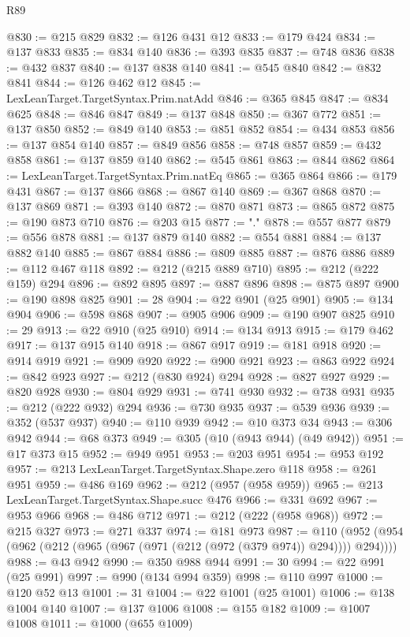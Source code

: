 \begin{lexlean}{R89}
\begin{coremodule}
@830 := @215 @829
@832 := @126 @431 @12
@833 := @179 @424
@834 := @137 @833
@835 := @834 @140
@836 := @393 @835
@837 := @748 @836
@838 := @432 @837
@840 := @137 @838 @140
@841 := @545 @840
@842 := @832 @841
@844 := @126 @462 @12
@845 := LexLeanTarget.TargetSyntax.Prim.natAdd
@846 := @365 @845
@847 := @834 @625
@848 := @846 @847
@849 := @137 @848
@850 := @367 @772
@851 := @137 @850
@852 := @849 @140
@853 := @851 @852
@854 := @434 @853
@856 := @137 @854 @140
@857 := @849 @856
@858 := @748 @857
@859 := @432 @858
@861 := @137 @859 @140
@862 := @545 @861
@863 := @844 @862
@864 := LexLeanTarget.TargetSyntax.Prim.natEq
@865 := @365 @864
@866 := @179 @431
@867 := @137 @866
@868 := @867 @140
@869 := @367 @868
@870 := @137 @869
@871 := @393 @140
@872 := @870 @871
@873 := @865 @872
@875 := @190 @873 @710
@876 := @203 @15
@877 := "."
@878 := @557 @877
@879 := @556 @878
@881 := @137 @879 @140
@882 := @554 @881
@884 := @137 @882 @140
@885 := @867 @884
@886 := @809 @885
@887 := @876 @886
@889 := @112 @467 @118
@892 := @212 (@215 @889 @710)
@895 := @212 (@222 @159) @294
@896 := @892 @895
@897 := @887 @896
@898 := @875 @897
@900 := @190 @898 @825
@901 := 28
@904 := @22 @901 (@25 @901)
@905 := @134 @904
@906 := @598 @868
@907 := @905 @906
@909 := @190 @907 @825
@910 := 29
@913 := @22 @910 (@25 @910)
@914 := @134 @913
@915 := @179 @462
@917 := @137 @915 @140
@918 := @867 @917
@919 := @181 @918
@920 := @914 @919
@921 := @909 @920
@922 := @900 @921
@923 := @863 @922
@924 := @842 @923
@927 := @212 (@830 @924) @294
@928 := @827 @927
@929 := @820 @928
@930 := @804 @929
@931 := @741 @930
@932 := @738 @931
@935 := @212 (@222 @932) @294
@936 := @730 @935
@937 := @539 @936
@939 := @352 (@537 @937)
@940 := @110 @939
@942 := @10 @373 @34
@943 := @306 @942
@944 := @68 @373
@949 := @305 (@10 (@943 @944) (@49 @942))
@951 := @17 @373 @15
@952 := @949 @951
@953 := @203 @951
@954 := @953 @192
@957 := @213 LexLeanTarget.TargetSyntax.Shape.zero @118
@958 := @261 @951
@959 := @486 @169
@962 := @212 (@957 (@958 @959))
@965 := @213 LexLeanTarget.TargetSyntax.Shape.succ @476
@966 := @331 @692
@967 := @953 @966
@968 := @486 @712
@971 := @212 (@222 (@958 @968))
@972 := @215 @327
@973 := @271 @337
@974 := @181 @973
@987 := @110 (@952 (@954 (@962 (@212 (@965 (@967 (@971 (@212 (@972 (@379 @974)) @294)))) @294))))
@988 := @43 @942
@990 := @350 @988 @944
@991 := 30
@994 := @22 @991 (@25 @991)
@997 := @990 (@134 @994 @359)
@998 := @110 @997
@1000 := @120 @52 @13
@1001 := 31
@1004 := @22 @1001 (@25 @1001)
@1006 := @138 @1004 @140
@1007 := @137 @1006
@1008 := @155 @182
@1009 := @1007 @1008
@1011 := @1000 (@655 @1009)

\end{coremodule}
\end{lexlean}
